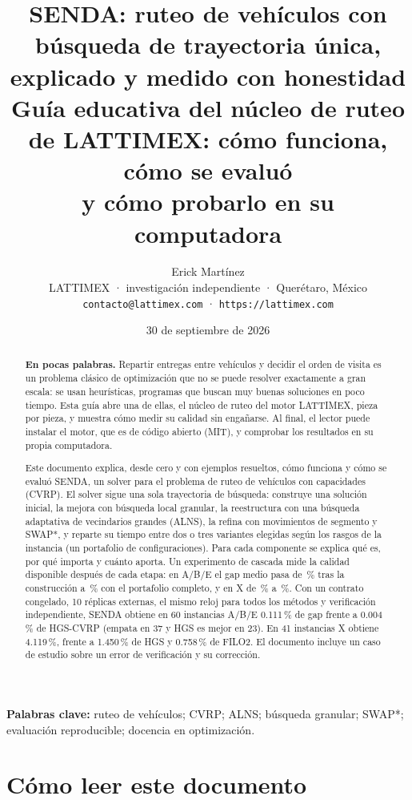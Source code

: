 \documentclass[11pt,a4paper]{article}
\title{\textbf{SENDA: ruteo de vehículos con búsqueda de trayectoria única,\\ explicado y medido con honestidad}\\[0.4em]
\large Guía educativa del núcleo de ruteo de LATTIMEX: cómo funciona, cómo se evaluó\\ y cómo probarlo en su computadora}
\author{Erick Martínez\\
\small LATTIMEX · investigación independiente · Querétaro, México\\
\small \texttt{contacto@lattimex.com} · \texttt{https://lattimex.com}}
\date{30 de septiembre de 2026}
\newcommand{\senda}{SENDA}
\begin{document}
\maketitle
\thispagestyle{licenciaguia}

\begin{abstract}
\noindent\textbf{En pocas palabras.} Repartir entregas entre vehículos y decidir el orden de visita es
un problema clásico de optimización que no se puede resolver exactamente a gran escala: se usan
heurísticas, programas que buscan muy buenas soluciones en poco tiempo. Esta guía abre una de ellas,
el núcleo de ruteo del motor LATTIMEX, pieza por pieza, y muestra cómo medir su calidad sin
engañarse. Al final, el lector puede instalar el motor, que es de código abierto (MIT), y comprobar
los resultados en su propia computadora.

\smallskip
\noindent Este documento explica, desde cero y con ejemplos resueltos, cómo funciona y cómo se evaluó
\senda, un solver para el problema de ruteo de vehículos con capacidades (CVRP). El solver sigue una
sola trayectoria de búsqueda: construye una solución inicial, la mejora con búsqueda local granular,
la reestructura con una búsqueda adaptativa de vecindarios grandes (ALNS), la refina con
movimientos de segmento y SWAP*, y reparte su tiempo entre dos o tres variantes elegidas según los
rasgos de la instancia (un portafolio de configuraciones). Para cada componente se explica qué es, por qué
importa y cuánto aporta. Un experimento de cascada mide la calidad disponible después de cada
etapa: en A/B/E el gap medio pasa de \cgABEa\,\% tras la construcción a \cgABEf\,\% con el portafolio
completo, y en X de \cgXa\,\% a \cgXf\,\%. Con un contrato congelado, 10 réplicas externas, el mismo
reloj para todos los métodos y verificación independiente, \senda{} obtiene en 60 instancias A/B/E
0.111\,\% de gap frente a 0.004\,\% de HGS-CVRP (empata en 37 y HGS es mejor en 23). En 41
instancias X obtiene 4.119\,\%, frente a 1.450\,\% de HGS y 0.758\,\% de FILO2. El documento incluye
un caso de estudio sobre un error de verificación y su corrección.
\end{abstract}

\noindent\textbf{Palabras clave:} ruteo de vehículos; CVRP; ALNS; búsqueda granular; SWAP*;
evaluación reproducible; docencia en optimización.

\tableofcontents
\newpage

\section*{Cómo leer este documento}
\end{document}
